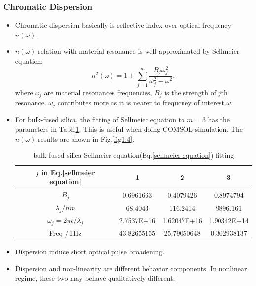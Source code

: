 \documentclass[12pt]{extarticle}
\newcommand{\<}{\langle}
\renewcommand{\>}{\rangle}
\theoremstyle{definition}
\begin{document}
        \subsubsection{Chromatic Dispersion}
            \begin{itemize}
                \item Chromatic dispersion basically is reflective index over optical frequency $n(\omega)$.
                \item $n(\omega)$ relation with material resonance is well approximated by Sellmeier equation:
                    \begin{equation}
                        n^2(\omega) = 1 + \sum_{j=1}^m \frac{B_j \omega_j^2}{\omega_j^2-\omega^2},
                        \label{sellmeier equation}
                    \end{equation}
                    where $\omega_j$ are material resonances frequencies, $B_j$ is the strength of $j$th resonance. $\omega_j$ contributes more as it is nearer to frequcney of interest $\omega$.
                \item For bulk-fused silica, the fitting of Sellmeier equation to $m = 3$ has the parameters in Table\ref{bulk-fused silica Sellmeier equation fitting}. This is useful when doing COMSOL simulation. The $n(\omega)$ results are shown in Fig.\ref{fig1.4}.
                    \begin{table}[htbp]
                    \centering
                        \begin{tabular}{|c|c|c|c|}
                        \hline
                        $j$ in Eq.\ref{sellmeier equation} & 1       & 2           & 3           \\ \hline
                        $B_j$                          & 0.6961663   & 0.4079426   & 0.8974794   \\ \hline
                        $\lambda_j / nm$               & 68.4043     & 116.2414    & 9896.161    \\ \hline
                        $\omega_j =2\pi c/\lambda_j$   & 2.7537E+16  & 1.62047E+16 & 1.90342E+14 \\ \hline
                        Freq /THz                      & 43.82655155 & 25.79050648 & 0.302938137 \\ \hline
                        \end{tabular}
                    \caption{bulk-fused silica Sellmeier equation(Eq.\ref{sellmeier equation}) fitting}
                    \label{bulk-fused silica Sellmeier equation fitting}
                    \end{table}
                \item Dispersion induce short optical pulse broadening.
                \item Dispersion and non-linearity are different behavior components. In nonlinear regime, these two may behave qualitatively different.
                

\end{itemize}
\end{document}
